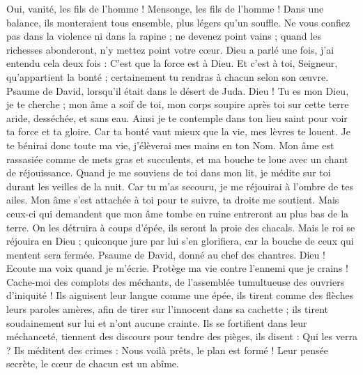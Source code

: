 \begin{multicols}{2}
Oui, vanité, les fils de l’homme ! Mensonge, les fils de l’homme ! Dans une balance, ils monteraient tous ensemble, plus légers qu’un souffle.
Ne vous confiez pas dans la violence ni dans la rapine ; ne devenez point vains ; quand les richesses abonderont, n'y mettez point votre cœur.
Dieu a parlé une fois, j'ai entendu cela deux fois : C’est que la force est à Dieu.
Et c'est à toi, Seigneur, qu'appartient la bonté ; certainement tu rendras à chacun selon son œuvre.
\VerseOne{}Psaume de David, lorsqu'il était dans le désert de Juda.
Dieu ! Tu es mon Dieu, je te cherche ; mon âme a soif de toi, mon corps soupire après toi sur cette terre aride, desséchée, et sans eau.
Ainsi je te contemple dans ton lieu saint pour voir ta force et ta gloire.
Car ta bonté vaut mieux que la vie, mes lèvres te louent.
Je te bénirai donc toute ma vie, j'élèverai mes mains en ton Nom.
Mon âme est rassasiée comme de mets gras et succulents, et ma bouche te loue avec un chant de réjouissance.
Quand je me souviens de toi dans mon lit, je médite sur toi durant les veilles de la nuit.
Car tu m'as secouru, je me réjouirai à l'ombre de tes ailes.
Mon âme s'est attachée à toi pour te suivre, ta droite me soutient.
Mais ceux-ci qui demandent que mon âme tombe en ruine entreront au plus bas de la terre.
On les détruira à coups d'épée, ils seront la proie des chacals.
Mais le roi se réjouira en Dieu ; quiconque jure par lui s'en glorifiera, car la bouche de ceux qui mentent sera fermée.
\VerseOne{}Psaume de David, donné au chef des chantres.
Dieu ! Ecoute ma voix quand je m'écrie. Protège ma vie contre l'ennemi que je crains !
Cache-moi des complots des méchants, de l'assemblée tumultueuse des ouvriers d'iniquité !
Ils aiguisent leur langue comme une épée, ils tirent comme des flèches leurs paroles amères,
afin de tirer sur l’innocent dans sa cachette ; ils tirent soudainement sur lui et n'ont aucune crainte.
Ils se fortifient dans leur méchanceté, tiennent des discours pour tendre des pièges, ils disent : Qui les verra ?
Ils méditent des crimes : Nous voilà prêts, le plan est formé ! Leur pensée secrète, le cœur de chacun est un abîme.

\end{multicols}
